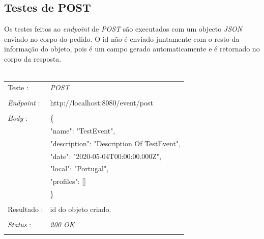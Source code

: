 \subsection{Testes de POST}\label{512}
Os testes feitos ao \emph{endpoint} de \emph{POST} são executados com um objecto \emph{JSON} enviado no corpo do pedido. O id não é enviado juntamente com o resto da informação do objeto, pois é um campo gerado automaticamente e é retornado no corpo da resposta.\\
\\
\begin{tabular}{ll}
	Teste : & \emph{POST}\\
	\\
	\emph{Endpoint} : & http://localhost:8080/event/post\\
	\\
	\emph{Body} : & \{ \\
				  &	"name": "TestEvent",\\
				  & "description": "Description Of TestEvent",\\
				  & "date": "2020-05-04T00:00:00.000Z",\\
				  & "local": "Portugal",\\
				  & "profiles": []\\
				  & \} \\
	\\
	Resultado : & id do objeto criado.\\
	\\
	\emph{Status} : & \emph{200 OK}\\
	\\
\end{tabular}

